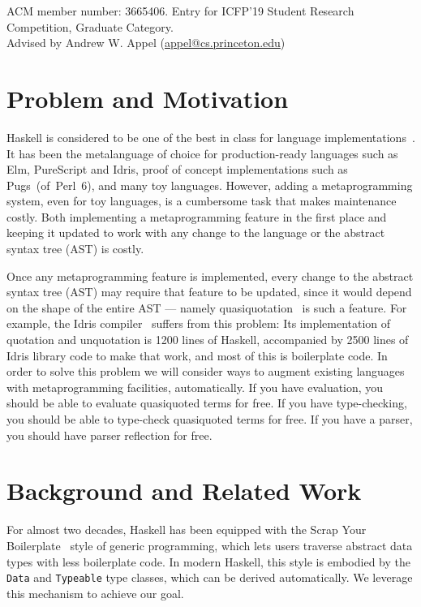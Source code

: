 \documentclass[format=acmsmall, review=false, screen=true]{acmart}
\newcommand{\CodeType}[1]{\textcolor{CodeBlue}{#1}}
\newcommand{\ty}[1]{\CodeType{\texttt{#1}}}
\begin{document}
\vspace{-2em}
\small{ACM member number: 3665406. Entry for ICFP'19 Student Research
Competition, Graduate Category.\\Advised by Andrew W. Appel (\href{mailto:appel@cs.princeton.edu}{appel@cs.princeton.edu})}
\normalsize



\section{Problem and Motivation}

Haskell is considered to be one of the best in class for language implementations~\cite{sotu}.
It has been the metalanguage of choice for production-ready languages such as Elm, PureScript and Idris, proof of concept implementations such as \mbox{Pugs (of Perl 6)}, and many toy languages.
However, adding a metaprogramming system, even for toy languages, is a cumbersome task that makes maintenance costly.
Both implementing a metaprogramming feature in the first place and keeping it updated to work with any change to the language or the abstract syntax tree (AST) is costly.

Once any metaprogramming feature is implemented, every change to the abstract syntax tree (AST) may require that feature to be updated, since it would depend on the shape of the entire AST --- namely quasiquotation~\cite{idrisQuotation} is such a feature.
For example, the Idris compiler~\cite{idris} suffers from this problem: Its implementation of quotation and unquotation is 1200 lines of Haskell, accompanied by 2500 lines of Idris library code to make that work, and most of this is boilerplate code. In order to solve this problem we will consider ways to augment existing languages with metaprogramming facilities, automatically.
If you have evaluation, you should be able to evaluate quasiquoted terms for free.
If you have type-checking, you should be able to type-check quasiquoted terms for free.
If you have a parser, you should have parser reflection for free.

\section{Background and Related Work}

For almost two decades, Haskell has been equipped with the Scrap Your
Boilerplate~\cite{syb,sybc} style of generic programming, which lets users traverse
abstract data types with less boilerplate code.
In modern Haskell, this style is embodied by the \ty{Data} and \ty{Typeable}
type classes, which can be derived automatically.
We leverage this mechanism to achieve our goal.
\end{document}
